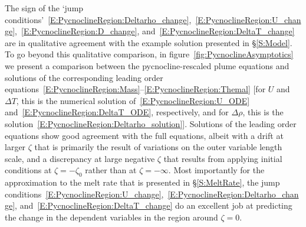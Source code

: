 \documentclass[openacc]{rsproca_new}%
\begin{document}
The sign of the `jump conditions'~\eqref{E:PycnoclineRegion:Deltarho_change},~\eqref{E:PycnoclineRegion:U_change},~\eqref{E:PycnoclineRegion:D_change}, and~\eqref{E:PycnoclineRegion:DeltaT_change} are in qualitative agreement with the example solution presented in \S\ref{S:Model}. To go beyond this qualitative comparison, in figure~\ref{fig:PycnoclineAsymptotics} we present a comparison between the pycnocline-rescaled plume equations and solutions of the corresponding leading order equations~\eqref{E:PycnoclineRegion:Mass}--\eqref{E:PycnoclineRegion:Themal}  [for $U$ and $\Delta T$, this is the numerical solution of~\eqref{E:PycnoclineRegion:U_ODE} and~\eqref{E:PycnoclineRegion:DeltaT_ODE}, respectively, and for $\Delta \rho$, this is the solution~\eqref{E:PycnoclineRegion:Deltarho_solution}]. Solutions of the leading order equations show good agreement with the full equations, albeit with a drift at larger $\zeta$ that is primarily the result of variations on the outer variable length scale, and a discrepancy at large negative $\zeta$ that results from applying  initial conditions at $\zeta = -\zeta_0$ rather than at $\zeta = -\infty$. Most importantly for the approximation to the melt rate that is presented in \S\ref{S:MeltRate}, the jump conditions~\eqref{E:PycnoclineRegion:U_change},~\eqref{E:PycnoclineRegion:Deltarho_change}, and~\eqref{E:PycnoclineRegion:DeltaT_change} do an excellent job at predicting the change in the dependent variables in the region around $\zeta = 0$.

\end{document}
